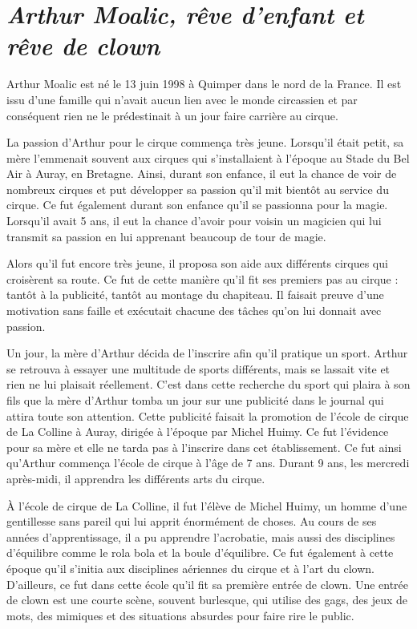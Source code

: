 \section*{\textit{Arthur Moalic, rêve d’enfant et rêve de clown}}
{}

Arthur Moalic est né le 13 juin 1998 à Quimper dans le nord de la France. Il est issu d’une famille qui n’avait aucun lien avec le monde circassien et par conséquent rien ne le prédestinait à un jour faire carrière au cirque.

La passion d’Arthur pour le cirque commença très jeune. Lorsqu’il était petit, sa mère l’emmenait souvent aux cirques qui s’installaient à l’époque au Stade du Bel Air à Auray, en Bretagne. Ainsi, durant son enfance, il eut la chance de voir de nombreux cirques et put développer sa passion qu’il mit bientôt au service du cirque. Ce fut également durant son enfance qu’il se passionna pour la magie. Lorsqu’il avait 5 ans, il eut la chance d’avoir pour voisin un magicien qui lui transmit sa passion en lui apprenant beaucoup de tour de magie.

Alors qu’il fut encore très jeune, il proposa son aide aux différents cirques qui croisèrent sa route. Ce fut de cette manière qu’il fit ses premiers pas au cirque : tantôt à la publicité, tantôt au montage du chapiteau. Il faisait preuve d’une motivation sans faille et exécutait chacune des tâches qu’on lui donnait avec passion. 

Un jour, la mère d'Arthur décida de l’inscrire afin qu’il pratique un sport. Arthur se retrouva à essayer une multitude de sports différents, mais se lassait vite et rien ne lui plaisait réellement. C’est dans cette recherche du sport qui plaira à son fils que la mère d’Arthur tomba un jour sur une publicité dans le journal qui attira toute son attention. Cette publicité faisait la promotion de l’école de cirque de La Colline à Auray, dirigée à l’époque par Michel Huimy. Ce fut l’évidence pour sa mère et elle ne tarda pas à l'inscrire dans cet établissement. Ce fut ainsi qu’Arthur commença l’école de cirque à l’âge de 7 ans. Durant 9 ans, les mercredi après-midi, il apprendra les différents arts du cirque. 

À l’école de cirque de La Colline, il fut l’élève de Michel Huimy, un homme d’une gentillesse sans pareil qui lui apprit énormément de choses. Au cours de ses années d’apprentissage, il a pu apprendre l’acrobatie, mais aussi des disciplines d’équilibre comme le rola bola et la boule d’équilibre. Ce fut également à cette époque qu’il s’initia aux disciplines aériennes du cirque et à l’art du clown. D’ailleurs, ce fut dans cette école qu’il fit sa première entrée de clown. Une entrée de clown est une courte scène, souvent burlesque, qui utilise des gags, des jeux de mots, des mimiques et des situations absurdes pour faire rire le public. 

